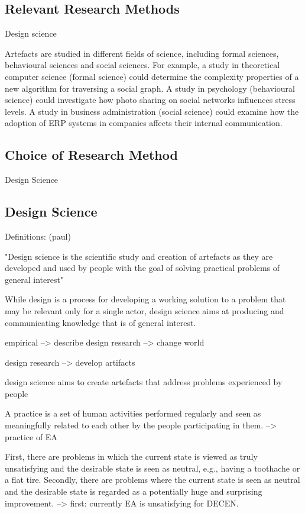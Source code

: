 \subsection{Relevant Research Methods}

Design science

Artefacts are studied in different fields of science, including formal
sciences, behavioural sciences and social sciences. For example, a
study in theoretical computer science (formal science) could determine
the complexity properties of a new algorithm for traversing a
social graph. A study in psychology (behavioural science) could investigate
how photo sharing on social networks influences stress
levels. A study in business administration (social science) could examine
how the adoption of ERP systems in companies affects their
internal communication.



\subsection{Choice of Research Method}

Design Science

\subsection{Design Science}

Definitions: (paul)

"Design science is the scientific study and creation of artefacts
as they are developed and used by people with the
goal of solving practical problems of general interest"

While design is a process
for developing a working solution to a problem that may be
relevant only for a single actor, design science aims at producing and
communicating knowledge that is of general interest.

empirical --> describe
design research --> change world

design research --> develop artifacts

design science aims to create artefacts that address
problems experienced by people

A practice is a set of human activities performed regularly and seen
as meaningfully related to each other by the people participating in
them. --> practice of EA

First, there are problems in which the current state is
viewed as truly unsatisfying and the desirable state is seen as neutral,
e.g., having a toothache or a flat tire. Secondly, there are problems
where the current state is seen as neutral and the desirable
state is regarded as a potentially huge and surprising improvement. --> first: currently EA is unsatisfying for DECEN.

